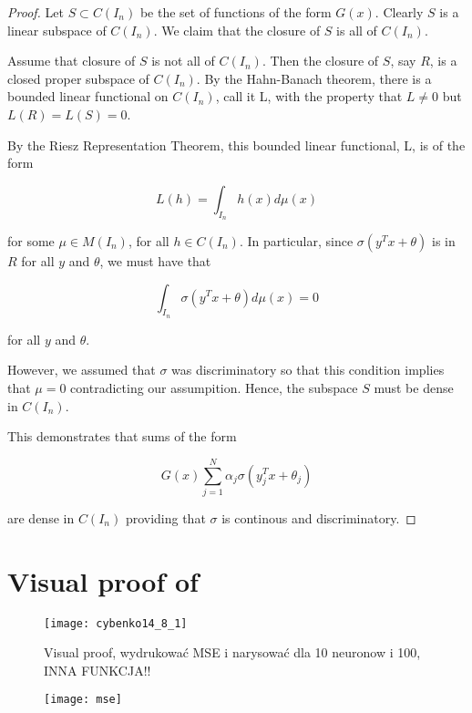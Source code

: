 \documentclass[]{article}
\theoremstyle{definition}
\begin{document}
\begin{proof}
Let $S \subset C(I_n)$ be the set of functions of the form $G(x)$. Clearly $S$ is a linear subspace of $C(I_n)$. We claim that the closure of $S$ is all of $C(I_n)$. 

Assume that closure of $S$ is not all of $C(I_n)$. Then the closure of $S$, say $R$, is a closed proper subspace of $C(I_n)$. By the Hahn-Banach theorem, there is a bounded linear functional on $C(I_n)$, call it L, with the property that $L \neq 0$ but $L(R) = L(S) = 0$.

By the Riesz Representation Theorem, this bounded linear functional, L, is of the form 

$$
L(h) = \int_{I_n} h(x)d\mu(x)
$$

for some $\mu \in M(I_n)$, for all $h \in C(I_n)$. In particular, since $\sigma(y^Tx + \theta)$ is in $R$ for all $y$ and $\theta$, we must have that

$$
\int_{I_n} \sigma \left(y^Tx + \theta \right) d\mu(x) = 0
$$

for all $y$ and $\theta$.

However, we assumed that $\sigma$ was discriminatory so that this condition implies that $\mu = 0$ contradicting our assumpition. Hence, the subspace $S$ must be dense in $C(I_n)$.

This demonstrates that sums of the form

$$
G(x) \sum_{j=1}^{N} \alpha_j \sigma\left(y_j^Tx + \theta_j\right)
$$

are dense in $C(I_n)$ providing that $\sigma$ is continous and discriminatory.

\end{proof}


\section{Visual proof of }

\begin{figure}[h]
	\centering
	\texttt{[image: cybenko14\_8\_1]}
	\caption{Visual proof, wydrukować MSE i narysować dla 10 neuronow i 100, INNA FUNKCJA!!}
\end{figure}

\begin{figure}[h]
	\centering
	\texttt{[image: mse]}
	\caption{}
\end{figure}
\end{document}

